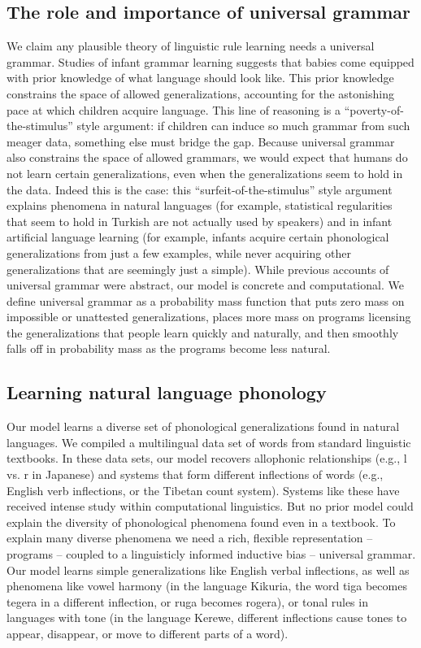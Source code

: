 \documentclass{article}
\begin{document}
\subsection{The role and importance of universal grammar}
                We claim any plausible theory of linguistic rule learning needs a universal grammar. Studies of infant grammar learning suggests that babies come equipped with prior knowledge of what language should look like. This prior knowledge constrains the space of allowed generalizations, accounting for the astonishing pace at which children acquire language. This line of reasoning is a ``poverty-of-the-stimulus'' style argument: if children can induce so much grammar from such meager data, something else must bridge the gap. Because universal grammar also constrains the space of allowed grammars, we would expect that humans do not learn certain generalizations, even when the generalizations seem to hold in the data. Indeed this is the case: this ``surfeit-of-the-stimulus'' style argument  explains phenomena in natural languages (for example, statistical regularities that seem to hold in Turkish are not actually used by speakers) and in infant artificial language learning (for example, infants acquire certain phonological generalizations from just a few examples, while never acquiring other generalizations that are seemingly just a simple). While previous accounts of universal grammar were abstract, our model is concrete and computational. We define universal grammar as a probability mass function that puts zero mass on impossible or unattested generalizations, places more mass on programs licensing the generalizations that people learn quickly and naturally, and then smoothly falls off in probability mass as the programs become less natural.

\subsection{Learning natural language phonology}                
Our model learns a diverse set of phonological generalizations found in natural languages. We compiled a multilingual data set of words from standard linguistic textbooks. In these data sets, our model recovers allophonic relationships (e.g., l vs. r in Japanese) and systems that form different inflections of words (e.g., English verb inflections, or the Tibetan count system). Systems like these have received intense study within computational linguistics. But no prior model could explain the diversity of phonological phenomena found even in a textbook. To explain many diverse phenomena we need a rich, flexible representation -- programs -- coupled to a linguisticly informed inductive bias -- universal grammar. Our model learns simple generalizations like English verbal inflections, as well as phenomena like vowel harmony (in the language Kikuria, the word tiga becomes tegera in a different inflection, or ruga becomes rogera), or tonal rules in languages with tone (in the language Kerewe, different inflections cause tones to appear, disappear, or move to different parts of a word).
\end{document}

